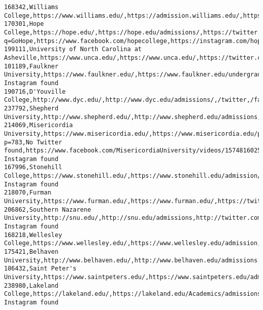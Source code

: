 \documentclass[11pt]{article}
\begin{document}
\begin{Verbatim}[commandchars=\\\{\}]
168342,Williams College,https://www.williams.edu/,https://admission.williams.edu/,https://twitter.com/williamscollege,https://www.facebook.com/williamscollege,https://instagram.com/williamscollege
170301,Hope College,https://hope.edu/,https://hope.edu/admissions/,https://twitter.com/search?q=GoHope,https://www.facebook.com/hopecollege,https://instagram.com/hopecollege/
199111,University of North Carolina at Asheville,https://www.unca.edu/,https://www.unca.edu/,https://twitter.com/UncAvl,https://www.facebook.com/UNCAsheville,https://www.instagram.com/unc\_asheville/
101189,Faulkner University,https://www.faulkner.edu/,https://www.faulkner.edu/undergrad/admissions/,https://twitter.com/FaulknerEdu,https://www.facebook.com/FaulknerUniversity,No Instagram found
190716,D'Youville College,http://www.dyc.edu/,http://www.dyc.edu/admissions/,/twitter,/facebook,/instagram
237792,Shepherd University,http://www.shepherd.edu/,http://www.shepherd.edu/admissions,https://twitter.com/ShepherdU,https://www.facebook.com/ShepherdUniversity,http://instagram.com/shepherdu
214069,Misericordia University,https://www.misericordia.edu/,https://www.misericordia.edu/page.cfm?p=783,No Twitter found,https://www.facebook.com/MisericordiaUniversity/videos/1574816025998479/,No Instagram found
167996,Stonehill College,https://www.stonehill.edu/,https://www.stonehill.edu/admission/,https://twitter.com/stonehill\_info,https://www.facebook.com/stonehillcollege,No Instagram found
218070,Furman University,https://www.furman.edu/,https://www.furman.edu/,https://twitter.com/FurmanU,http://www.facebook.com/FurmanUniversity,http://instagram.com/furmanuniversity/
206862,Southern Nazarene University,http://snu.edu/,http://snu.edu/admissions,http://twitter.com/FollowSNU,https://www.facebook.com/FollowSNU,No Instagram found
168218,Wellesley College,https://www.wellesley.edu/,https://www.wellesley.edu/admission,http://www.twitter.com/wellesley,http://www.facebook.com/WellesleyCollege,http://www.instagram.com/wellesleycollege
175421,Belhaven University,http://www.belhaven.edu/,http://www.belhaven.edu/admissions.htm,https://twitter.com/belhavenu,https://www.facebook.com/belhavenuniversity,https://instagram.com/belhavenu/
186432,Saint Peter's University,https://www.saintpeters.edu/,https://www.saintpeters.edu/admission/,http://twitter.com/saintpetersuniv,http://www.facebook.com/saintpetersuniversity,https://www.instagram.com/saintpetersuniversity/
238980,Lakeland College,https://lakeland.edu/,https://lakeland.edu/Academics/admissions,https://twitter.com/LakelandWI,https://www.facebook.com/LakelandUniversityWI,No Instagram found

\end{Verbatim}
\end{document}
